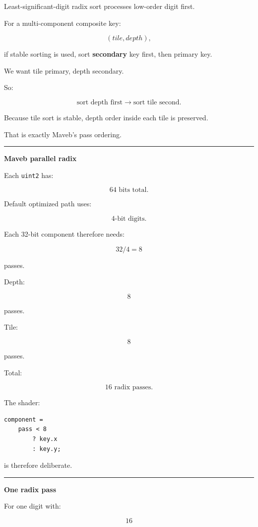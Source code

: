 Least-significant-digit radix sort processes low-order digit first.

For a multi-component composite key:

\[
(tile,depth),
\]

if stable sorting is used, sort \textbf{secondary} key first, then primary key.

We want tile primary, depth secondary.

So:

\[
\boxed{
\text{sort depth first}
\rightarrow
\text{sort tile second}.
}
\]

Because tile sort is stable, depth order inside each tile is preserved.

That is exactly Maveb's pass ordering.

\begin{center}\rule{0.5\linewidth}{0.5pt}\end{center}

\textbf{Maveb parallel radix}

Each \texttt{uint2} has:

\[
64\text{ bits total}.
\]

Default optimized path uses:

\[
4\text{-bit digits}.
\]

Each 32-bit component therefore needs:

\[
32/4=8
\]

passes.

Depth:

\[
8
\]

passes.

Tile:

\[
8
\]

passes.

Total:

\[
\boxed{16\text{ radix passes}.}
\]

The shader:

\begin{verbatim}
component =
    pass < 8
        ? key.x
        : key.y;
\end{verbatim}

is therefore deliberate.

\begin{center}\rule{0.5\linewidth}{0.5pt}\end{center}

\textbf{One radix pass}

For one digit with:

\[
16
\]

